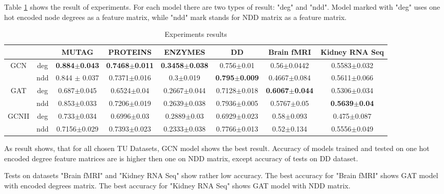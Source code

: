Table \ref{tab:results} shows the result of experiments. For each model there are two types of result: "deg" and "ndd".
Model marked with "deg" uses one hot encoded node degrees as a feature matrix, while "ndd" mark stands for NDD matrix 
as a feature matrix.

\begin{table}[]
    \scriptsize
    \begin{tabular}{|c|c|c|c|c|c|c|c|}
        \hline
                               &     & MUTAG                 & PROTEINS               & ENZYMES                & DD                    & Brain fMRI             & Kidney RNA Seq        \\ \hline
        \multirow{2}{*}{GCN}   & deg & \textbf{0.884$\pm$0.043} & \textbf{0.7468$\pm$0.011} & \textbf{0.3458$\pm$0.038} & 0.756$\pm$0.01           & 0.56$\pm$0.0442           & 0.5583$\pm$0.032         \\
                               & ndd & 0.844 $\pm$ 0.037         & 0.7371$\pm$0.016          & 0.3$\pm$0.019             & \textbf{0.795$\pm$0.009} & 0.4667$\pm$0.084          & 0.5611$\pm$0.066         \\ \cline{1-8}
        \multirow{2}{*}{GAT}   & deg & 0.687$\pm$0.045          & 0.6524$\pm$0.04           & 0.2667$\pm$0.044          & 0.7128$\pm$0.018         & \textbf{0.6067$\pm$0.044} & 0.5306$\pm$0.034         \\
                               & ndd & 0.853$\pm$0.033          & 0.7206$\pm$0.019          & 0.2639$\pm$0.038          & 0.7936$\pm$0.005         & 0.5767$\pm$0.05           & \textbf{0.5639$\pm$0.04} \\ \cline{1-8}
        \multirow{2}{*}{GCNII} & deg & 0.733$\pm$0.034          & 0.6996$\pm$0.03           & 0.2889$\pm$0.03           & 0.6929$\pm$0.023         & 0.58$\pm$0.093            & 0.475$\pm$0.087          \\
                               & ndd & 0.7156$\pm$0.029         & 0.7393$\pm$0.023          & 0.2333$\pm$0.038          & 0.7766$\pm$0.013         & 0.52$\pm$0.134            & 0.5556$\pm$0.049         \\ \hline
    \end{tabular}
    \caption{Experiments results}
    \label{tab:results}
\end{table}

As result shows, that for all chosen TU Datasets, GCN model shows the best result. Accuracy of models trained and tested on one hot encoded degree feature matrices
are is higher then one on NDD matrix, except accuracy of tests on DD dataset.

Tests on datasets "Brain fMRI" and "Kidney RNA Seq" show rather low accuracy. The best accuracy for "Brain fMRI" shows GAT model with encoded degrees matrix. 
The best accuracy for "Kidney RNA Seq" shows GAT model with NDD matrix. 
